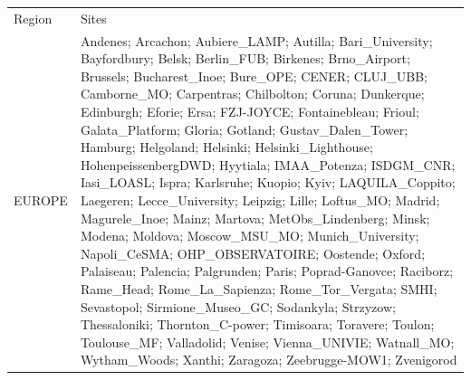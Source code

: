\documentclass[journal abbreviation, manuscript]{copernicus}
\begin{document}
\begin{table}
 \scriptsize
 \begin{tabularx}{\textwidth}{lX}
  \tophline
  Region    & Sites                                                                                                                                                                                                                                                                                                                                                                                                                                                                                                                                                                                                                                                                                                                                                                                                                                                                                                                                                                                                                                                                                                                                                                                                                                                                                                                                                                                                                                                                                                                                                   \\
  \middlehline
  EUROPE    & Andenes; Arcachon; Aubiere\_LAMP; Autilla; Bari\_University; Bayfordbury; Belsk; Berlin\_FUB; Birkenes; Brno\_Airport; Brussels; Bucharest\_Inoe; Bure\_OPE; CENER; CLUJ\_UBB; Camborne\_MO; Carpentras; Chilbolton; Coruna; Dunkerque; Edinburgh; Eforie; Ersa; FZJ-JOYCE; Fontainebleau; Frioul; Galata\_Platform; Gloria; Gotland; Gustav\_Dalen\_Tower; Hamburg; Helgoland; Helsinki; Helsinki\_Lighthouse; HohenpeissenbergDWD; Hyytiala; IMAA\_Potenza; ISDGM\_CNR; Iasi\_LOASL; Ispra; Karlsruhe; Kuopio; Kyiv; LAQUILA\_Coppito; Laegeren; Lecce\_University; Leipzig; Lille; Loftus\_MO; Madrid; Magurele\_Inoe; Mainz; Martova; MetObs\_Lindenberg; Minsk; Modena; Moldova; Moscow\_MSU\_MO; Munich\_University; Napoli\_CeSMA; OHP\_OBSERVATOIRE; Oostende; Oxford; Palaiseau; Palencia; Palgrunden; Paris; Poprad-Ganovce; Raciborz; Rame\_Head; Rome\_La\_Sapienza; Rome\_Tor\_Vergata; SMHI; Sevastopol; Sirmione\_Museo\_GC; Sodankyla; Strzyzow; Thessaloniki; Thornton\_C-power; Timisoara; Toravere; Toulon; Toulouse\_MF; Valladolid; Venise; Vienna\_UNIVIE; Watnall\_MO; Wytham\_Woods; Xanthi; Zaragoza; Zeebrugge-MOW1; Zvenigorod                                                                                                                                                                                                                                                                                                                                                                                               \\

\end{tabularx}
\end{table}
\end{document}
